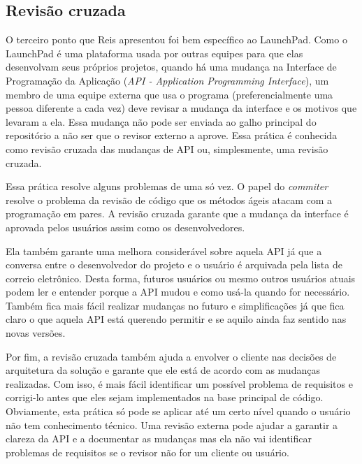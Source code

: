 \subsection{Revisão cruzada}
\label{subsec:crossrev}


O terceiro ponto que Reis apresentou foi bem específico ao
LaunchPad. Como o LaunchPad é uma plataforma usada por outras equipes
para que elas desenvolvam seus próprios projetos, quando há uma
mudança na Interface de Programação da Aplicação (\emph{API -
  Application Programming Interface}), um membro de uma equipe externa
que usa o programa (preferencialmente uma pessoa diferente a cada vez)
deve revisar a mudança da interface e os motivos que levaram a
ela. Essa mudança não pode ser enviada ao galho principal do
repositório a não ser que o revisor externo a aprove. Essa prática é
conhecida como revisão cruzada das mudanças de API ou, simplesmente,
uma revisão cruzada.

Essa prática resolve alguns problemas de uma só vez. O papel do
\emph{commiter} resolve o problema da revisão de código que os métodos
ágeis atacam com a programação em pares. A revisão cruzada garante que
a mudança da interface é aprovada pelos usuários assim como os
desenvolvedores.

Ela também garante uma melhora considerável sobre aquela API já que a
conversa entre o desenvolvedor do projeto e o usuário é arquivada pela
lista de correio eletrônico. Desta forma, futuros usuários ou mesmo
outros usuários atuais podem ler e entender porque a API mudou e como
usá-la quando for necessário. Também fica mais fácil realizar mudanças
no futuro e simplificações já que fica claro o que aquela API está
querendo permitir e se aquilo ainda faz sentido nas novas versões.

Por fim, a revisão cruzada também ajuda a envolver o cliente nas
decisões de arquitetura da solução e garante que ele está de acordo
com as mudanças realizadas. Com isso, é mais fácil identificar um
possível problema de requisitos e corrigi-lo antes que eles sejam
implementados na base principal de código. Obviamente, esta prática só
pode se aplicar até um certo nível quando o usuário não tem
conhecimento técnico. Uma revisão externa pode ajudar a garantir a
clareza da API e a documentar as mudanças mas ela não vai identificar
problemas de requisitos se o revisor não for um cliente ou usuário.


